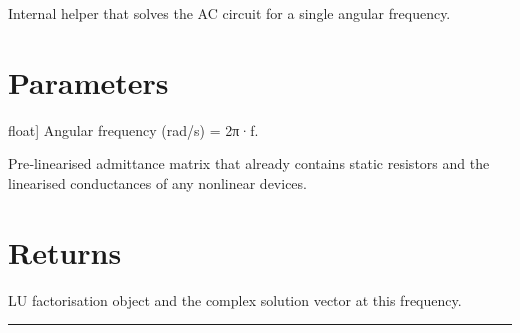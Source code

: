 \documentclass[letterpaper,10pt,english]{sphinxmanual}
\begin{document}
\begin{fulllineitems}
\label{\detokenize{ac_engine:ACEngine._solve_single_point}}
\pysigstartsignatures
\pysiglinewithargsret
{}
{\sphinxparamcomma {}}
{}
\pysigstopsignatures
\sphinxAtStartPar
Internal helper that solves the AC circuit for a single angular frequency.


\section{Parameters}
\label{\detokenize{ac_engine:parameters}}\begin{description}
\sphinxlineitem{w}{[}float{]}
\sphinxAtStartPar
Angular frequency (rad/s) = 2π·f.

\sphinxlineitem{Y\_small\_signal\_base}{[}\sphinxcode{\sphinxupquote{scipy.sparse.lil\_matrix}}{]}
\sphinxAtStartPar
Pre‑linearised admittance matrix that already contains static resistors
and the linearised conductances of any nonlinear devices.

\end{description}


\section{Returns}
\label{\detokenize{ac_engine:returns}}\begin{description}
\sphinxAtStartPar
{} \textendash{} LU factorisation object and the
complex solution vector at this frequency.

\end{description}

\end{fulllineitems}



\bigskip\hrule\bigskip
\end{document}
